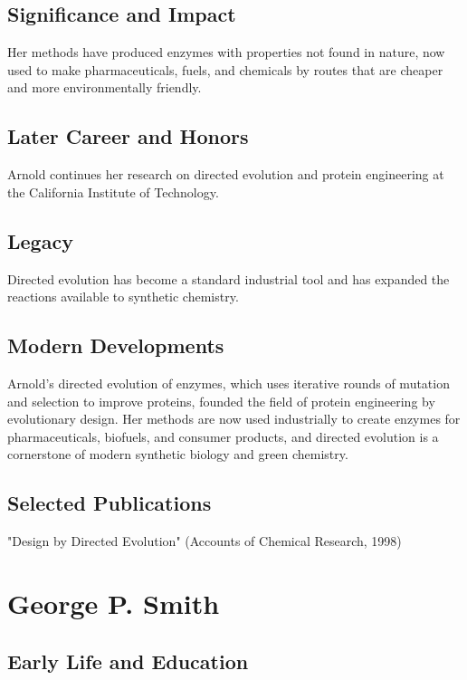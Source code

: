 \subsection*{Significance and Impact}

Her methods have produced enzymes with properties not found in nature, now used to make pharmaceuticals, fuels, and chemicals by routes that are cheaper and more environmentally friendly.

\subsection*{Later Career and Honors}

Arnold continues her research on directed evolution and protein engineering at the California Institute of Technology.

\subsection*{Legacy}

Directed evolution has become a standard industrial tool and has expanded the reactions available to synthetic chemistry.

\subsection*{Modern Developments}

Arnold's directed evolution of enzymes, which uses iterative rounds of mutation and selection to improve proteins, founded the field of protein engineering by evolutionary design. Her methods are now used industrially to create enzymes for pharmaceuticals, biofuels, and consumer products, and directed evolution is a cornerstone of modern synthetic biology and green chemistry.

\subsection*{Selected Publications}

"Design by Directed Evolution" (Accounts of Chemical Research, 1998)

\clearpage

\section{George P. Smith}

\subsection*{Early Life and Education}

